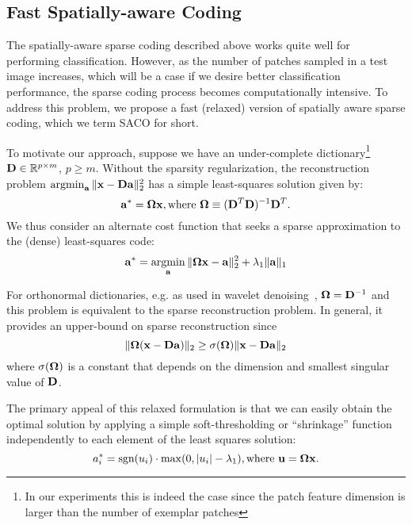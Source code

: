 \documentclass[10pt,twocolumn,letterpaper]{article}
\def\a{{\bf a}}
\def\D{{\bf D}}
\def\x{{\bf x}}
\def\u{{\bf u}}
\def\RB{{\mathbb R}}
\def\argmin{\mathop{\rm argmin}}
\begin{document}
\subsection{Fast Spatially-aware Coding}
The spatially-aware sparse coding described above works quite well for
performing classification.  However, as the number of patches sampled in a test
image increases, which will be a case if we desire better classification
performance, the sparse coding process becomes computationally intensive.  To
address this problem, we propose a fast (relaxed) version of spatially aware
sparse coding, which we term SACO for short.

To motivate our approach, suppose we have an under-complete dictionary\footnote{In our experiments this is indeed the case since the patch feature
dimension is larger than the number of exemplar patches} $\D \in \RB^{p\times
m}$, $p\ge m$.  Without the sparsity regularization, the reconstruction problem
$\argmin_{\a}\Vert \x - \D\a \Vert_2^2$ has a simple least-squares
solution given by:
\begin{equation}
\a^* = {\bf \Omega} \x, \text{where } {\bf \Omega}\equiv (\D^T \D) ^{-1}\D^T.
\end{equation}
We thus consider an alternate cost function that seeks a sparse approximation
to the (dense) least-squares code:
\begin{equation}
\a^*= \argmin_{\a}\Vert {\bf \Omega}\x - \a \Vert_2^2 + \lambda_1 \Vert \a \Vert_1
\end{equation}

For orthonormal dictionaries, e.g. as used in wavelet
denoising~\cite{donoho1994ideal,simoncelli1996noise}, ${\bf \Omega} = \D^{-1}$ and
this problem is equivalent to the sparse reconstruction problem.  In general,
it provides an upper-bound on sparse reconstruction since
\begin{equation}
\Vert {\bf \Omega}(\x - \D \a) \Vert_2 \geq \sigma({\bf \Omega}) \Vert \x - \D \a \Vert_2
\end{equation}
where $\sigma({\bf \Omega})$ is a constant that depends on the dimension
and smallest singular value of $\D$.

The primary appeal of this relaxed formulation is that we can easily obtain the
optimal solution by applying a simple soft-thresholding or ``shrinkage''
function independently to each element of the least squares solution:
\begin{equation}
a_i^* = \text{sgn}( u_i) \cdot  \max(0, \vert u_i\vert -\lambda_1), \text{where } \u={\bf \Omega}\x.
\end{equation}
\end{document}
